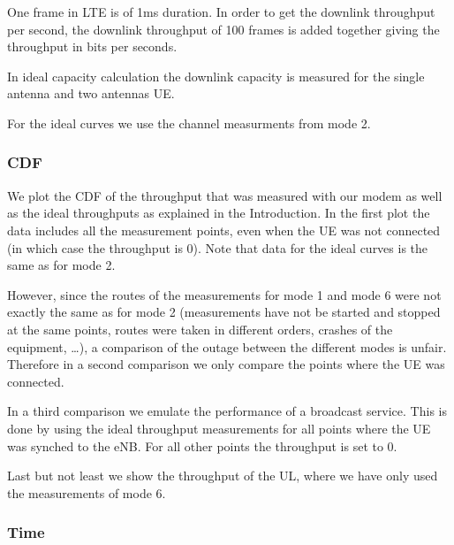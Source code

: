 \documentclass[a4paper,10pt]{article}
\newcommand{\printfile}[2][]{
 \begin{minipage}{8cm}
  \centering
  \texttt{[image: /extras/kaltenbe/CNES/emos\_postprocessed\_data/\#2]}
  \url{#2}: #1

 \end{minipage}
}
\begin{document}
One frame in LTE is of 1ms duration. In order to get the downlink throughput per second, the downlink throughput of 100 frames is added together giving the throughput in bits per seconds.

In ideal capacity calculation the downlink capacity is measured for the single antenna and two antennas UE.  

For the ideal curves we use the channel measurments from mode 2.




\subsubsection{CDF}
\label{sec:cdf}


We plot the CDF of the throughput that was measured with our modem as well as the ideal throughputs as explained in the Introduction. In the first plot the data includes all the measurement points, even when the UE was not connected (in which case the throughput is 0). Note that data for the ideal curves is the same as for mode 2. 

However, since the routes of the measurements for mode 1 and mode 6 were not exactly the same as for mode 2 (measurements have not be started and stopped at the same points, routes were taken in different orders, crashes of the equipment, \ldots), a comparison of the outage between the different modes is unfair. Therefore in a second comparison we only compare the points where the UE was connected. 

In a third comparison we emulate the performance of a broadcast service. This is done by using the ideal throughput measurements for all points where the UE was synched to the eNB. For all other points the throughput is set to 0.

Last but not least we show the throughput of the UL, where we have only used the measurements of mode 6.


\subsubsection{Time}
\end{document}
